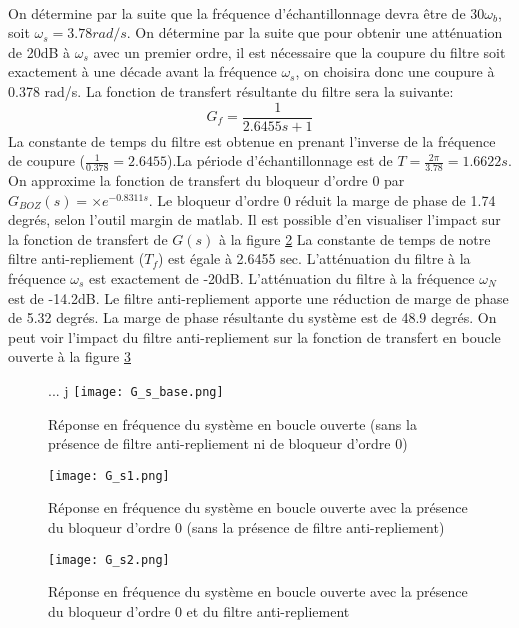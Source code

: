 \paragraph{} On détermine par la suite que la fréquence d'échantillonnage devra être de $30\omega_b$, soit $\omega_s = 3.78 rad/s$. On détermine par la suite que pour obtenir une atténuation de 20dB à $\omega_s$ avec un premier ordre, il est nécessaire que la coupure du filtre soit exactement à une décade avant la fréquence $\omega_s$, on choisira donc une coupure à 0.378 rad/s. La fonction de transfert résultante du filtre sera la suivante:
\begin{equation}
G_f = \frac{1}{2.6455s +1}
\end{equation}
La constante de temps du filtre est obtenue en prenant l'inverse de la fréquence de coupure ($\frac{1}{0.378} = 2.6455$).La période d'échantillonnage est de $T = \frac{2 \pi}{3.78} =1.6622 s$. On approxime la fonction de transfert du bloqueur d'ordre 0 par $G_{BOZ}(s) = \times e^{-0.8311s}$. Le bloqueur d'ordre 0 réduit la marge de phase de 1.74 degrés, selon l'outil margin de matlab. Il est possible d'en visualiser l'impact sur la fonction de transfert de $G(s)$ à la figure \ref{fig3} La constante de temps de notre filtre anti-repliement ($T_f$) est égale à 2.6455 sec. L'atténuation du filtre à la fréquence $\omega_s$ est exactement de -20dB. L'atténuation du filtre à la fréquence $\omega_N$ est de -14.2dB. Le filtre anti-repliement apporte une réduction de marge de phase de 5.32 degrés. La marge de phase résultante du système est de 48.9 degrés. On peut voir l'impact du filtre anti-repliement sur la fonction de transfert en boucle ouverte à la figure \ref{fig4}
\begin{figure}... j
\centering
\texttt{[image: G\_s\_base.png]}
\caption{Réponse en fréquence du système en boucle ouverte (sans la présence de filtre anti-repliement ni de bloqueur d'ordre 0)}
\label{fig2}
\end{figure}
\begin{figure}
\centering
\texttt{[image: G\_s1.png]}
\caption{Réponse en fréquence du système en boucle ouverte avec la présence du bloqueur d'ordre 0 (sans la présence de filtre anti-repliement)}
\label{fig3}
\end{figure}
\begin{figure}
\centering
\texttt{[image: G\_s2.png]}
\caption{Réponse en fréquence du système en boucle ouverte avec la présence du bloqueur d'ordre 0 et du filtre anti-repliement}
\label{fig4}
\end{figure}
